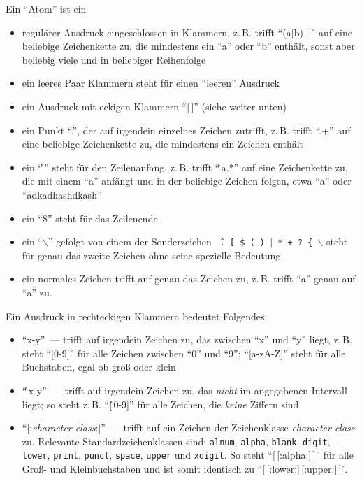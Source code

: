Ein "`Atom"' ist ein
\begin{itemize}
\item  regulärer Ausdruck eingeschlossen in Klammern, z.\,B. trifft "`(a$|$b)+"'
          auf eine beliebige Zeichenkette zu, die mindestens
          ein "`a"' oder "`b"' enthält, sonst aber beliebig viele und in
          beliebiger Reihenfolge
        \item   ein leeres Paar Klammern steht für einen "`leeren"'
          Ausdruck
        \item   ein Ausdruck mit eckigen Klammern "`[\,]"' (siehe weiter unten)
        \item ein Punkt "`."', der auf irgendein einzelnes Zeichen zutrifft,
          z.\,B. trifft "`.+"' auf eine beliebige Zeichenkette zu, die
          mindestens ein Zeichen enthält
        \item ein "`\^\,"' steht für den Zeilenanfang, z.\,B. trifft "`\^\,a.*"' auf
          eine Zeichenkette zu, die mit einem "`a"' anfängt und in der
          beliebige Zeichen folgen, etwa "`a"' oder "`adkadhashdkash"'
        \item ein "`\$"' steht für das Zeilenende
        \item ein "`$\backslash$"' gefolgt von einem der Sonderzeichen
          \texttt{\^\,.\,[\,\$\,(\,)\,$|$\,*\,+\,?\,\{\,$\backslash$} steht für genau das zweite Zeichen
          ohne seine spezielle Bedeutung
        \item  ein normales Zeichen trifft auf genau das Zeichen zu,
          z.\,B. trifft "`a"' genau auf "`a"' zu.
\end{itemize}

Ein Ausdruck in rechteckigen Klammern bedeutet Folgendes:
\begin{itemize}
\item "`x-y"'~--- trifft auf irgendein Zeichen zu, das zwischen
                  "`x"' und "`y"' liegt, z.\,B. steht "`[0-9]"' für alle Zeichen
                  zwischen "`0"' und "`9"'; "`[a-zA-Z]"' steht für alle Buchstaben,
                  egal ob groß oder klein

                \item "`\^\,x-y"'~--- trifft auf irgendein Zeichen zu, das \emph{nicht} im
                  angegebenen Intervall liegt; so steht z.\,B. "`[\^\,0-9]"' für alle
                  Zeichen, die \emph{keine} Ziffern sind

                \item "`[:\emph{character-class}:]"'~--- trifft auf ein Zeichen der Zeichenklasse \emph{character-class}
                  zu. Relevante Standardzeichenklassen sind: \texttt{alnum}, \texttt{alpha},
                  \texttt{blank}, \texttt{digit}, \texttt{lower}, \texttt{print}, \texttt{punct}, \texttt{space}, \texttt{upper} und \texttt{xdigit}.
                So steht "`[\,[:alpha:]\,]"' für alle Groß- und Kleinbuchstaben und ist somit identisch zu "`[\,[:lower:]\,[:upper:]\,]"'.
\end{itemize}


